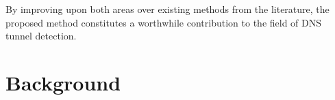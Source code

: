 \documentclass{llncs}
\begin{document}
By improving upon both areas over existing methods from the literature, the
proposed method constitutes a worthwhile contribution to the field of DNS tunnel
detection.

\section{Background}

%
%
%
%
\end{document}
